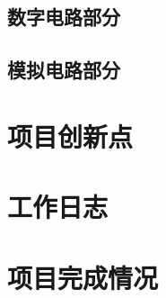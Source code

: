 \documentclass[a4paper]{paper}
\begin{document}
\subsection{数字电路部分}
\subsection{模拟电路部分}
\section{项目创新点}
\section{工作日志}
\section{项目完成情况}
\end{document}
